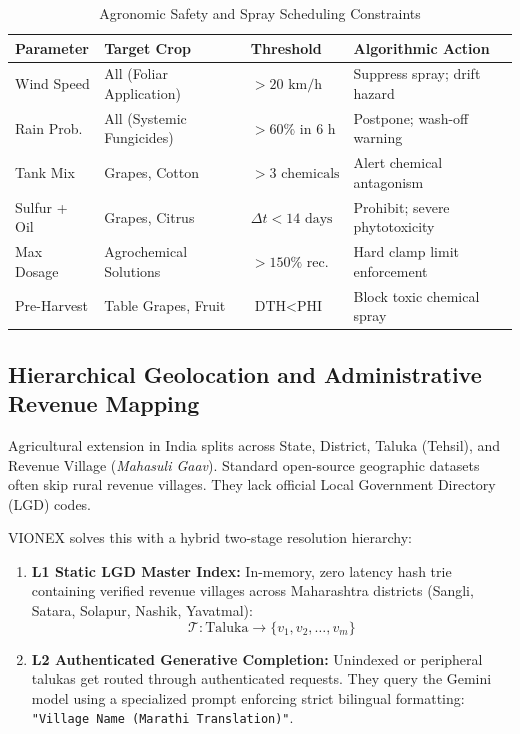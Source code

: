 \documentclass[conference]{IEEEtran}
\begin{document}
\begin{table}[htbp]
\caption{Agronomic Safety and Spray Scheduling Constraints}
\label{tab:agronomic_rules}
\centering
\begin{tabularx}{\columnwidth}{l p{2.2cm} p{1.6cm} X}
\toprule
\textbf{Parameter} & \textbf{Target Crop} & \textbf{Threshold} & \textbf{Algorithmic Action} \\
\midrule
Wind Speed & All (Foliar Application) & $> 20\text{ km/h}$ & Suppress spray; drift hazard \\
Rain Prob. & All (Systemic Fungicides) & $> 60\%\text{ in 6 h}$ & Postpone; wash-off warning \\
Tank Mix & Grapes, Cotton & $> 3\text{ chemicals}$ & Alert chemical antagonism \\
Sulfur + Oil & Grapes, Citrus & $\Delta t < 14\text{ days}$ & Prohibit; severe phytotoxicity \\
Max Dosage & Agrochemical Solutions & $> 150\%\text{ rec.}$ & Hard clamp limit enforcement \\
Pre-Harvest & Table Grapes, Fruit & $\text{DTH} < \text{PHI}$ & Block toxic chemical spray \\
\bottomrule
\end{tabularx}
\end{table}

\subsection{Hierarchical Geolocation and Administrative Revenue Mapping}
Agricultural extension in India splits across State, District, Taluka (Tehsil), and Revenue Village (\textit{Mahasuli Gaav}). Standard open-source geographic datasets often skip rural revenue villages. They lack official Local Government Directory (LGD) codes.

VIONEX solves this with a hybrid two-stage resolution hierarchy:
\begin{enumerate}
    \item \textbf{L1 Static LGD Master Index:} In-memory, zero latency hash trie containing verified revenue villages across Maharashtra districts (Sangli, Satara, Solapur, Nashik, Yavatmal):
    \begin{equation}
    \mathcal{T}: \text{Taluka} \to \{ v_1, v_2, \dots, v_m \}
    \end{equation}
    \item \textbf{L2 Authenticated Generative Completion:} Unindexed or peripheral talukas get routed through authenticated requests. They query the Gemini model using a specialized prompt enforcing strict bilingual formatting: \texttt{"Village Name (Marathi Translation)"}.
\end{enumerate}
\end{document}
